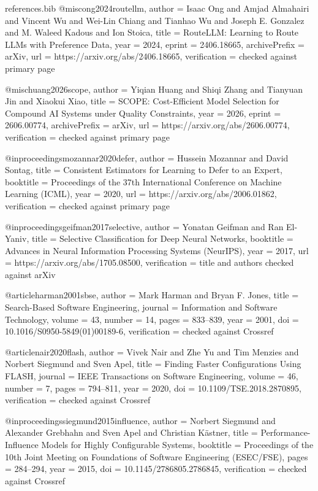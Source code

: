 \begin{filecontents*}[overwrite]{references.bib}
@misc{ong2024routellm,
  author = {Isaac Ong and Amjad Almahairi and Vincent Wu and Wei-Lin Chiang and Tianhao Wu and Joseph E. Gonzalez and M. Waleed Kadous and Ion Stoica},
  title = {{RouteLLM}: Learning to Route {LLMs} with Preference Data},
  year = {2024},
  eprint = {2406.18665},
  archivePrefix = {arXiv},
  url = {https://arxiv.org/abs/2406.18665},
  verification = {checked against primary page}
}

@misc{huang2026scope,
  author = {Yiqian Huang and Shiqi Zhang and Tianyuan Jin and Xiaokui Xiao},
  title = {{SCOPE}: Cost-Efficient Model Selection for Compound {AI} Systems under Quality Constraints},
  year = {2026},
  eprint = {2606.00774},
  archivePrefix = {arXiv},
  url = {https://arxiv.org/abs/2606.00774},
  verification = {checked against primary page}
}

@inproceedings{mozannar2020defer,
  author = {Hussein Mozannar and David Sontag},
  title = {Consistent Estimators for Learning to Defer to an Expert},
  booktitle = {Proceedings of the 37th International Conference on Machine Learning (ICML)},
  year = {2020},
  url = {https://arxiv.org/abs/2006.01862},
  verification = {checked against primary page}
}

@inproceedings{geifman2017selective,
  author = {Yonatan Geifman and Ran El-Yaniv},
  title = {Selective Classification for Deep Neural Networks},
  booktitle = {Advances in Neural Information Processing Systems (NeurIPS)},
  year = {2017},
  url = {https://arxiv.org/abs/1705.08500},
  verification = {title and authors checked against arXiv}
}

@article{harman2001sbse,
  author = {Mark Harman and Bryan F. Jones},
  title = {Search-Based Software Engineering},
  journal = {Information and Software Technology},
  volume = {43},
  number = {14},
  pages = {833--839},
  year = {2001},
  doi = {10.1016/S0950-5849(01)00189-6},
  verification = {checked against Crossref}
}

@article{nair2020flash,
  author = {Vivek Nair and Zhe Yu and Tim Menzies and Norbert Siegmund and Sven Apel},
  title = {Finding Faster Configurations Using {FLASH}},
  journal = {IEEE Transactions on Software Engineering},
  volume = {46},
  number = {7},
  pages = {794--811},
  year = {2020},
  doi = {10.1109/TSE.2018.2870895},
  verification = {checked against Crossref}
}

@inproceedings{siegmund2015influence,
  author = {Norbert Siegmund and Alexander Grebhahn and Sven Apel and Christian K{\"a}stner},
  title = {Performance-Influence Models for Highly Configurable Systems},
  booktitle = {Proceedings of the 10th Joint Meeting on Foundations of Software Engineering (ESEC/FSE)},
  pages = {284--294},
  year = {2015},
  doi = {10.1145/2786805.2786845},
  verification = {checked against Crossref}
}


\end{filecontents*}

